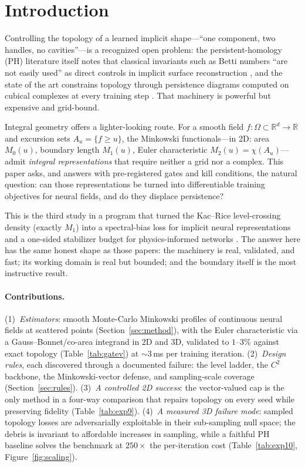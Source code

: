 \documentclass[10pt]{article}
\newcommand{\R}{\mathbb{R}}
\begin{document}
\section{Introduction}
\label{sec:intro}

Controlling the topology of a learned implicit shape---``one component, two handles,
no cavities''---is a recognized open problem: the persistent-homology (PH) literature
itself notes that classical invariants such as Betti numbers ``are not easily used''
as direct controls in implicit surface reconstruction \citep{dong2022topologycad}, and
the state of the art constrains topology through persistence diagrams computed on
cubical complexes at every training step \citep{stitch2024}. That machinery is
powerful but expensive and grid-bound.

Integral geometry offers a lighter-looking route. For a smooth field
$f:\Omega\subset\R^d\to\R$ and excursion sets $A_u=\{f\ge u\}$, the Minkowski
functionals---in 2D: area $M_0(u)$, boundary length $M_1(u)$, Euler characteristic
$M_2(u)=\chi(A_u)$---admit \emph{integral representations} that require neither a grid
nor a complex. This paper asks, and answers with pre-registered gates and kill
conditions, the natural question: can those representations be turned into
differentiable training objectives for neural fields, and do they displace
persistence?

This is the third study in a program that turned the Kac--Rice level-crossing density
(exactly $M_1$) into a spectral-bias loss for implicit neural representations
\citep{howe2026levelcrossing} and a one-sided stabilizer budget for physics-informed
networks \citep{howe2026budget}. The answer here has the same honest shape as those
papers: the machinery is real, validated, and fast; its working domain is real but
bounded; and the boundary itself is the most instructive result.

\paragraph{Contributions.}
(1)~\emph{Estimators}: smooth Monte-Carlo Minkowski profiles of continuous neural
fields at scattered points (Section~\ref{sec:method}), with the Euler characteristic
via a Gauss--Bonnet/co-area integrand in 2D and 3D, validated to $1$--$3\%$ against
exact topology (Table~\ref{tab:gatev}) at $\sim$3\,ms per training iteration.
(2)~\emph{Design rules}, each discovered through a documented failure: the level
ladder, the $C^2$ backbone, the Minkowski-vector defense, and sampling-scale coverage
(Section~\ref{sec:rules}).
(3)~\emph{A controlled 2D success}: the vector-valued cap is the only method in a
four-way comparison that repairs topology on every seed while preserving fidelity
(Table~\ref{tab:exp9}).
(4)~\emph{A measured 3D failure mode}: sampled topology losses are adversarially
exploitable in their sub-sampling null space; the debris is invariant to affordable
increases in sampling, while a faithful PH baseline solves the benchmark at
$250\times$ the per-iteration cost (Table~\ref{tab:exp10},
Figure~\ref{fig:scaling}).
\end{document}
